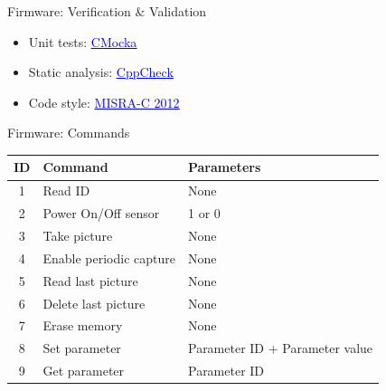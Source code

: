 
\begin{frame}{Firmware: Verification \& Validation}

    \begin{itemize}
        \item Unit tests: \href{https://cmocka.org/}{\textcolor{blue}{\underline{CMocka}}}
        \vspace{0.5cm}
        \item Static analysis: \href{https://cppcheck.sourceforge.io/}{\textcolor{blue}{\underline{CppCheck}}}
        \vspace{0.5cm}
        \item Code style: \href{https://www.misra.org.uk/}{\textcolor{blue}{\underline{MISRA-C 2012}}}
    \end{itemize}

\end{frame}


\begin{frame}{Firmware: Commands}

\begin{table}[!htb]
    \centering
    \label{tab:commands}
    \begin{tabular}{cll}
        \toprule[1.5pt]
        \textbf{ID} & \textbf{Command} & \textbf{Parameters}\\
        \midrule
        1 & Read ID                 & None \\
        2 & Power On/Off sensor     & 1 or 0 \\
        3 & Take picture            & None \\
        4 & Enable periodic capture & None \\
        5 & Read last picture       & None \\
        6 & Delete last picture     & None \\
        7 & Erase memory            & None \\
        8 & Set parameter           & Parameter ID + Parameter value \\
        9 & Get parameter           & Parameter ID \\
        \bottomrule[1.5pt]
    \end{tabular}
\end{table}

\end{frame}

